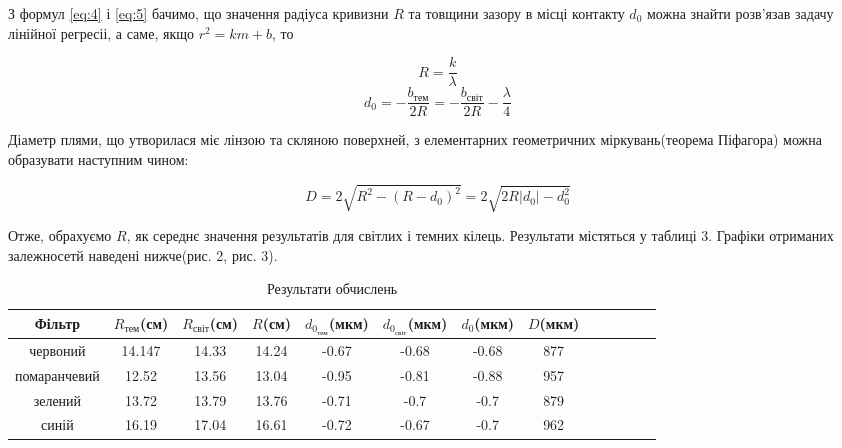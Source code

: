 З формул \ref{eq:4} і \ref{eq:5} бачимо, що значення радіуса 
кривизни $R$ та товщини зазору в місці контакту $d_0$ можна знайти 
розв'язав задачу лінійної регресіі, а саме, якщо $r^2 = k m + b$, то

$$ R = \frac{k}{\lambda} $$
$$ d_0 = - \frac{b_{тем}}{2R} = - \frac{b_{світ}}{2R} - \frac{\lambda}{4} $$

Діаметр плями, що утворилася міє лінзою та скляною поверхней, з елементарних
геометричних міркувань(теорема Піфагора) можна образувати наступним чином:

$$ D = 2 \sqrt{R^2 - (R-d_0)^2} = 2 \sqrt{2R|d_0| - d_0^2} $$

Отже, обрахуємо $R$, як середнє значення результатів для світлих і темних 
кілець. Результати містяться у таблиці 3. Графіки отриманих залежносетй наведені нижче(рис. 2, рис. 3).

\begin{table}[h]
    \centering
    \begin{tabular}{|c|c|c|c|c|c|c|c|c|c|c|c|c|}
        \hline
        \textbf{Фільтр} & \textbf{$R_{тем}$(см)} & \textbf{$R_{світ}$(см)} & \textbf{$R$(см)} &
        \textbf{$d_{0_{тем}}$(мкм)} & \textbf{$d_{0_{світ}}$(мкм)} & \textbf{$d_0$(мкм)} & \textbf{$D$(мкм)} \\
        \hline

        червоний & 14.147 & 14.33 & 14.24 & -0.67 & -0.68 & -0.68 & 877 \\
        \hline
        
        помаранчевий & 12.52 & 13.56 & 13.04 & -0.95 & -0.81 & -0.88 & 957 \\
        \hline
        
        зелений & 13.72 & 13.79 & 13.76 & -0.71 & -0.7 & -0.7 & 879 \\
        \hline

        синій & 16.19 & 17.04 & 16.61 & -0.72 & -0.67 & -0.7 & 962 \\
        \hline

    \end{tabular}
    \caption{Результати обчислень}
\end{table}



